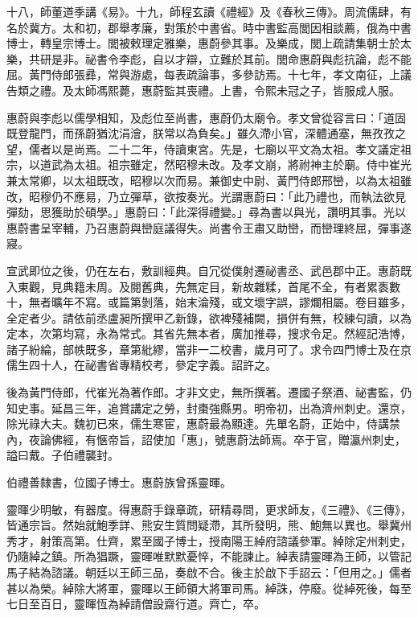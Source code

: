 \begin{pinyinscope}
 十八，師董道季講《易》。十九，師程玄讀《禮經》及《春秋三傳》。周流儒肆，有名於冀方。太和初，郡舉孝廉，對策於中書省。時中書監高閭因相談薦，俄為中書博士，轉皇宗博士。閭被敕理定雅樂，惠蔚參其事。及樂成，閭上疏請集朝士於太樂，共研是非。祕書令李彪，自以才辯，立難於其前。閭命惠蔚與彪抗論，彪不能屈。黃門侍郎張彞，常與游處，每表疏論事，多參訪焉。十七年，孝文南征，上議
 告類之禮。及太師馮熙薨，惠蔚監其喪禮。上書，令熙未冠之子，皆服成人服。



 惠蔚與李彪以儒學相知，及彪位至尚書，惠蔚仍太廟令。孝文曾從容言曰：「道固既登龍門，而孫蔚猶沈涓澮，朕常以為負矣。」雖久滯小官，深體通塞，無孜孜之望，儒者以是尚焉。二十二年，侍讀東宮。先是，七廟以平文為太祖。孝文議定祖宗，以道武為太祖。祖宗雖定，然昭穆未改。及孝文崩，將祔神主於廟。侍中崔光兼太常卿，以太祖既改，昭穆以次而易。兼御史中尉、黃門侍郎邢巒，以為太祖雖改，昭穆仍不應易，乃立彈草，欲按奏光。光謂惠蔚曰：「此乃禮也，而執法欲見
 彈劾，思獲助於碩學。」惠蔚曰：「此深得禮變。」尋為書以與光，讚明其事。光以惠蔚書呈宰輔，乃召惠蔚與巒庭議得失。尚書令王肅又助巒，而巒理終屈，彈事遂寢。



 宣武即位之後，仍在左右，敷訓經典。自冗從僕射遷祕書丞、武邑郡中正。惠蔚既入東觀，見典籍未周。及閱舊典，先無定目，新故雜糅，首尾不全，有者累袠數十，無者曠年不寫。或篇第剝落，始末淪殘，或文壞字誤，謬爛相屬。卷目雖多，全定者少。請依前丞盧昶所撰甲乙新錄，欲裨殘補闕，損併有無，校練句讀，以為定本，次第均寫，永為常式。其省先無本者，廣加推尋，搜求令足。然經記浩博，
 諸子紛綸，部帙既多，章第紕繆，當非一二校書，歲月可了。求令四門博士及在京儒生四十人，在祕書省專精校考，參定字義。詔許之。



 後為黃門侍郎，代崔光為著作郎。才非文史，無所撰著。遷國子祭酒、祕書監，仍知史事。延昌三年，追賞講定之勞，封棗強縣男。明帝初，出為濟州刺史。還京，除光祿大夫。魏初已來，儒生寒宦，惠蔚最為顯達。先單名蔚，正始中，侍講禁內，夜論佛經，有愜帝旨，詔使加「惠」，號惠蔚法師焉。卒于官，贈瀛州刺史，謚曰戴。子伯禮襲封。



 伯禮善隸書，位國子博士。惠蔚族曾孫靈暉。



 靈暉少明敏，有器度。得惠蔚手錄章疏，研精尋問，更求師友，《三禮》、《三傳》，皆通宗旨。然始就鮑季詳、熊安生質問疑滯，其所發明，熊、鮑無以異也。舉冀州秀才，射策高第。仕齊，累至國子博士，授南陽王綽府諮議參軍。綽除定州刺史，仍隨綽之鎮。所為猖蹶，靈暉唯默默憂悴，不能諫止。綽表請靈暉為王師，以管記馬子結為諮議。朝廷以王師三品，奏啟不合。後主於啟下手詔云：「但用之。」儒者甚以為榮。綽除大將軍，靈暉以王師領大將軍司馬。綽誅，停廢。從綽死後，每至七日至百日，靈暉恆為綽請僧設齋行道。齊亡，卒。




\end{pinyinscope}
